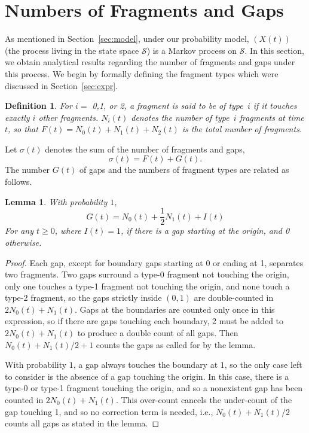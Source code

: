 \documentclass{amsart}
\def\Scal{\mathcal{S}}
\newtheorem{defi}{Definition}
\newtheorem{lemma}{Lemma}
\begin{document}
\section{Numbers of Fragments and Gaps}\label{sec:behav}
As mentioned in Section~\ref{sec:model}, under our probability model, $(X(t))$ (the process living in the state space $\Scal$)  is a Markov
process on $\Scal$. In this section, we obtain analytical results regarding the number of fragments and gaps under this process. We begin by formally defining the fragment types which were discussed in Section~\ref{sec:expr}.
\begin{defi}
For  $i =$ 0,1, or 2, a fragment is said to be of type~$i$ if it touches
exactly $i$ other fragments.  $N_i(t)$ denotes the number of type~$i$ fragments at time
$t$, so that $F(t) = N_0(t)+N_1(t)+N_2(t)$ is the total number of fragments.
\end{defi}
Let $\sigma(t)$ denotes the sum of the number of fragments and gaps,
\begin{equation}\label{def-sigma}
\sigma(t)=F(t)+G(t).
\end{equation}
The number $G(t)$ of gaps and the numbers of fragment types are related as
follows.
\begin{lemma} \label{lemma:comb}
    With probability $1$,
    \begin{equation} \label{eq:G}
        G(t) = N_0(t) + \frac{1}{2} N_1(t) + I(t)
    \end{equation}
For any $t \geq 0$, where $I(t)=1$, if there is a gap starting at the
origin, and 0 otherwise.
\end{lemma}
\begin{proof} Each gap, except for boundary
gaps starting at 0 or ending at 1, separates two fragments.   Two
gaps surround a type-0 fragment not touching the origin, only one
touches a type-1 fragment not touching the origin, and none touch a
type-2 fragment, so the gaps strictly inside $(0,1)$ are double-counted in $2N_0(t)
+ N_1(t)$. Gaps at the  boundaries are counted only once in this
expression, so if there are gaps touching each boundary, 2 must be
added to $2N_0(t) + N_1(t)$ to produce a double count of all gaps.
Then $N_0 (t) + N_1(t)/2 + 1$ counts the gaps as called for by the
lemma.

With probability $1$, a gap always touches the boundary at $1$, so the only
case left to consider is the absence of a gap touching the origin.
In this case, there is a type-0 or type-1 fragment touching the
origin, and so a nonexistent gap has been counted in $2N_0(t)+N_1(t)$.
This over-count cancels the under-count of the gap touching 1, and
so no correction term is needed, i.e., $N_0(t) + N_1(t)/2$ counts
all gaps as stated in the lemma.
\end{proof}
\end{document}

